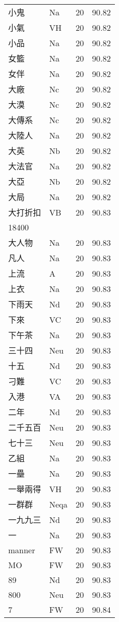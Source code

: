\documentclass[twocolumn]{book}
\begin{document}
\begin{supertabular}{llrr}
小鬼 & Na & 20 &  90.82\\
小氣 & VH & 20 &  90.82\\
小品 & Na & 20 &  90.82\\
女籃 & Na & 20 &  90.82\\
女伴 & Na & 20 &  90.82\\
大廠 & Nc & 20 &  90.82\\
大漠 & Nc & 20 &  90.82\\
大傳系 & Nc & 20 &  90.82\\
大陸人 & Na & 20 &  90.82\\
大英 & Nb & 20 &  90.82\\
大法官 & Na & 20 &  90.82\\
大亞 & Nb & 20 &  90.82\\
大局 & Na & 20 &  90.82\\
大打折扣 & VB & 20 &  90.83\\
18400\\
大人物 & Na & 20 &  90.83\\
凡人 & Na & 20 &  90.83\\
上流 & A & 20 &  90.83\\
上衣 & Na & 20 &  90.83\\
下雨天 & Nd & 20 &  90.83\\
下來 & VC & 20 &  90.83\\
下午茶 & Na & 20 &  90.83\\
三十四 & Neu & 20 &  90.83\\
十五 & Nd & 20 &  90.83\\
刁難 & VC & 20 &  90.83\\
入港 & VA & 20 &  90.83\\
二年 & Nd & 20 &  90.83\\
二千五百 & Neu & 20 &  90.83\\
七十三 & Neu & 20 &  90.83\\
乙組 & Na & 20 &  90.83\\
一壘 & Na & 20 &  90.83\\
一舉兩得 & VH & 20 &  90.83\\
一群群 & Neqa & 20 &  90.83\\
一九九三 & Nd & 20 &  90.83\\
一 & Na & 20 &  90.83\\
manner & FW & 20 &  90.83\\
MO & FW & 20 &  90.83\\
89 & Nd & 20 &  90.83\\
800 & Neu & 20 &  90.83\\
7 & FW & 20 &  90.84\\

\end{supertabular}
\end{document}
